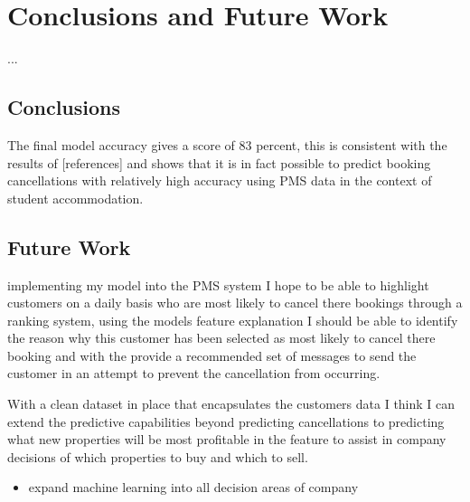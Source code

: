 \chapter{Conclusions and Future Work}
\label{ch:con}
...

\section{Conclusions}
The final model accuracy gives a score  of 83 percent, this is consistent with the results of [references] and shows that it is in fact possible to predict booking cancellations with relatively high accuracy using PMS data in the context of student accommodation. 

\section{Future Work}
implementing my model into the PMS system I hope to be able to highlight customers on a daily basis who are most likely to cancel there bookings through a ranking system, using the models feature explanation I should be able to identify the reason why this customer has been selected as most likely to cancel there booking and with the provide a recommended set of messages to send the customer in an attempt to prevent the cancellation from occurring. 

\vspace{5mm}

With a clean dataset in place that encapsulates the customers data I think I can extend the predictive capabilities beyond predicting cancellations to predicting what new properties will be most profitable in the feature to assist in company decisions of which properties to buy and which to sell.

\begin{itemize}
\item expand machine learning into all decision areas of company
\end{itemize}
